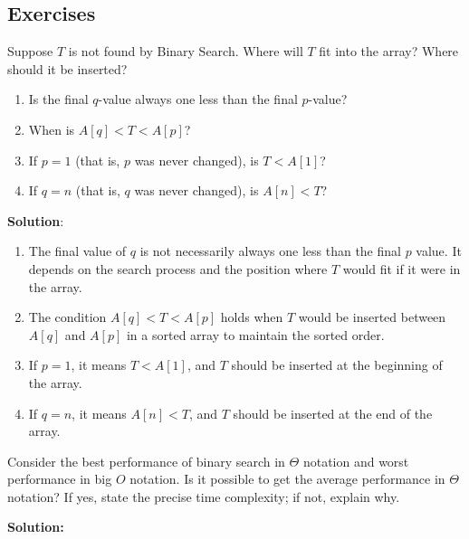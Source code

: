     \subsection{Exercises}
    \begin{exercise}
        Suppose \( T \) is not found by Binary Search. Where will \( T \) fit into the array? 
        Where should it be inserted?
    \begin{enumerate}
        \item Is the final \( q \)-value always one less than the final \( p \)-value?
        \item When is \( A[q] < T < A[p] \)?
        \item If \( p = 1 \) (that is, \( p \) was never changed), is \( T < A[1] \)?
        \item If \( q = n \) (that is, \( q \) was never changed), is \( A[n] < T \)?
    \end{enumerate}
    \end{exercise}
    
    \textbf{Solution}:
    \begin{enumerate}
        \item The final value of \( q \) is not necessarily always one less than the final \( p \) value. It depends on the search process and the position where \( T \) would fit if it were in the array.
        \item The condition \( A[q] < T < A[p] \) holds when \( T \) would be inserted between \( A[q] \) and \( A[p] \) in a sorted array to maintain the sorted order.
        \item If \( p = 1 \), it means \( T < A[1] \), and \( T \) should be inserted at the beginning of the array.
        \item If \( q = n \), it means \( A[n] < T \), and \( T \) should be inserted at the end of the array.
    \end{enumerate}


    \begin{exercise}
        Consider the best performance of binary search in $\Theta$ notation and worst performance in big $O$ notation. Is it possible to get the average performance in $\Theta$ notation? If yes, state the precise time complexity; if not, explain why.
    \end{exercise}
    \textbf{Solution:}

